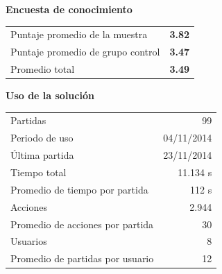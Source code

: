 \documentclass[portrait,final,a0paper,fontscale=0.277]{baposter}
\begin{document}
\begin{poster}
{\begin{multicols}{2}
\begin{center}
  
 \end{center}

\textbf{Encuesta de conocimiento}
\begin{center}
		\scriptsize 
		\begin{tabular}{lr}
			\toprule
			Puntaje promedio de la muestra    & \textbf{3.82} \\
			Puntaje promedio de grupo control & \textbf{3.47} \\
			\midrule
			Promedio total                    & \textbf{3.49} \\
			\bottomrule
		\end{tabular}
	\end{center}
 
	
\textbf{Uso de la solución}
\begin{center}
    \scriptsize
\begin{tabular}{lr}
\toprule
Partidas                         & 99 \\
Periodo de uso                 & 04/11/2014 \\
Última partida                   & 23/11/2014 \\
\midrule
Tiempo total       & 11.134 s \\
Promedio de tiempo por partida   & 112 s
\\\midrule
Acciones           & 2.944 \\
Promedio de acciones por partida & 30
\\\midrule
Usuarios           & 8 \\
Promedio de partidas por usuario & 12
\\\bottomrule
\end{tabular}                                                      
\end{center}


\end{multicols}}
\end{poster}
\end{document}
